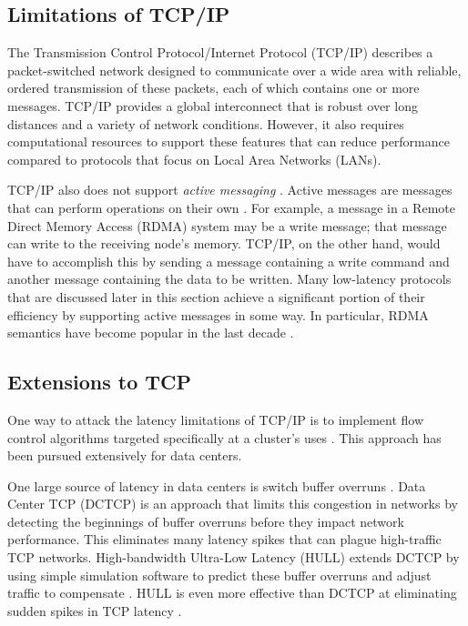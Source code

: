 \documentclass[11pt]{book}
\begin{document}
\subsection{Limitations of TCP/IP}

The Transmission Control Protocol/Internet Protocol (TCP/IP) describes a packet-switched
network designed to communicate over a wide area with reliable, ordered transmission of
these packets, each of which contains one or more messages.  TCP/IP provides a global
interconnect that is robust over long distances and a variety of network conditions.
However, it also requires computational resources to support these features that can
reduce performance compared to protocols that focus on Local Area Networks (LANs).

TCP/IP also does not support \emph{active messaging} \cite{liu-94}.  Active messages are
messages that can perform operations on their own \cite{palumbo-92}.  For example, a
message in a Remote Direct Memory Access (RDMA) system may be a write message; that
message can write to the receiving node's memory.  TCP/IP, on the other hand, would have
to accomplish this by sending a message containing a write command and another message
containing the data to be written.  Many low-latency protocols that are discussed later in
this section achieve a significant portion of their efficiency by supporting active
messages in some way.  In particular, RDMA semantics have become popular in the last
decade \cite{huang-07}.

\subsection{Extensions to TCP}

One way to attack the latency limitations of TCP/IP is to implement flow control
algorithms targeted specifically at a cluster's uses \cite{liu-13}.  This approach has
been pursued extensively for data centers.

One large source of latency in data centers is switch buffer overruns \cite{liu-13}.  Data
Center TCP (DCTCP) \cite{alizadeh-11} is an approach that limits this congestion in
networks by detecting the beginnings of buffer overruns before they impact network
performance.  This eliminates many latency spikes that can plague high-traffic TCP
networks.  High-bandwidth Ultra-Low Latency (HULL) extends DCTCP by using simple
simulation software to predict these buffer overruns and adjust traffic to compensate
\cite{alizadeh-12}. HULL is even more effective than DCTCP at eliminating sudden spikes in
TCP latency \cite{liu-13}.
\end{document}

